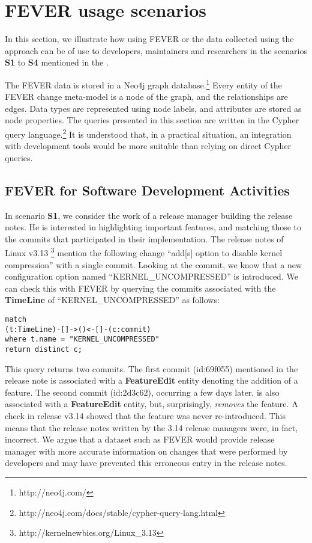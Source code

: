 
\section{FEVER usage scenarios}
\label{sec:in_practice}
In this section, we illustrate how using FEVER or the data collected using the approach can be of use 
to developers, maintainers and researchers in the scenarios \textbf{S1} to \textbf{S4} mentioned in the .

The FEVER data is stored in a Neo4j graph database.\footnote{http://neo4j.com/} 
Every entity of the FEVER change meta-model is a node of the graph, and the relationships are edges.
Data types are represented using node labels, and attributes are stored as node properties.
The queries presented in this section are written in the Cypher query language.\footnote{http://neo4j.com/docs/stable/cypher-query-lang.html}
It is understood that, in a practical situation, an integration with development tools would be more suitable than 
relying on direct Cypher queries.

\subsection{FEVER for Software Development Activities}

In scenario \textbf{S1}, we consider the work of a release manager
building the release notes. He is interested in highlighting important features, 
and matching those to the commits that participated in their implementation.
The release notes of Linux v3.13 \footnote{http://kernelnewbies.org/Linux\_3.13}
mention the following change ``add[s] option to disable kernel compression'' with a single commit.
Looking at the commit, we know that a new configuration option named ``KERNEL\_\-UNCOMPRESSED'' is introduced.
We can check this with FEVER by querying the commits 
associated with the \textbf{TimeLine} of ``KERNEL\_\-UNCOMPRESSED'' as follows:
\vspace{-.5ex}
\begin{verbatim}
match 
(t:TimeLine)-[]->()<-[]-(c:commit)
where t.name = "KERNEL_UNCOMPRESSED"
return distinct c; 
\end{verbatim}
\vspace{-.5ex}
This query returns two commits. The first commit (id:69f055) mentioned in the release note
is associated with a \textbf{FeatureEdit} entity denoting the addition of a feature.
The second commit (id:2d3c62), occurring a few days later, is also associated with a \textbf{FeatureEdit} entity, but, surprisingly, \emph{removes} the feature.
A check in release v3.14 showed that the feature was never re-introduced. This means that the release notes written by the 3.14 release managers were, in fact, incorrect.
We argue that a dataset such as FEVER would provide release manager with more accurate information on changes that were performed by developers and may have prevented this erroneous entry in the release notes.

